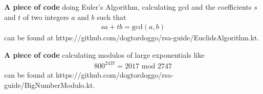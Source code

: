 \documentclass[]{paper}
\begin{document}
\textbf{A piece of code} doing Euler's Algorithm, calculating gcd and the coefficients $s$ and $t$ of two integers $a$ and $b$ such that
\begin{eqnarray*}
sa + tb = \text{gcd}(a,b)
\end{eqnarray*}  
can be found at https://github.com/dogtordoggo/rsa-guide/EuclidsAlgorithm.kt.

\textbf{A piece of code} calculating modulos of large exponentials like
\begin{eqnarray*}
800^{2437}= 2017\text{ mod } 2747
\end{eqnarray*}
can be found at https://github.com/dogtordoggo/rsa-guide/BigNumberModulo.kt.
\end{document}
